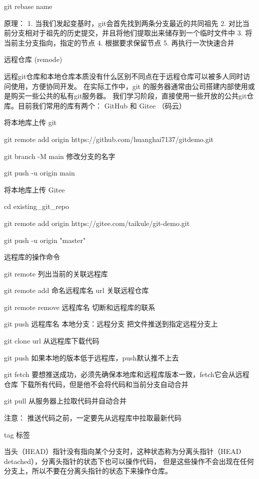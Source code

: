         git rebase name

        原理：
            1. 当我们发起变基时，git会首先找到两条分支最近的共同祖先
            2. 对比当前分支相对于祖先的历史提交，并且将他们提取出来储存到一个临时文件中
            3. 将当前主分支指向，指定的节点
            4. 根据要求保留节点
            5. 再执行一次快速合并

        远程仓库 (remode)

        远程git仓库和本地仓库本质没有什么区别不同点在于远程仓库可以被多人同时访问使用，方便协同开发。
        在实际工作中，git 的服务器通常由公司搭建内部使用或是购买一些公共的私有git服务器。
        我们学习阶段，直接使用一些开放的公共git仓库。目前我们常用的库有两个： GitHub 和 Gitee （码云）

        将本地库上传 git

        git remote add origin https://github.com/huanghai7137/gitdemo.git

        git branch -M main      修改分支的名字

        git push -u origin main

        将本地库上传 Gitee

        cd existing_git_repo

        git remote add origin https://gitee.com/taikule/git-demo.git
        
        git push -u origin "master"

        远程库的操作命令

        git remote      列出当前的关联远程库

        git remote add 命名远程库名 url   关联远程仓库

        git remote remove 远程库名      切断和远程库的联系

        git push 远程库名 本地分支：远程分支    把文件推送到指定远程分支上

        git clone url   从远程库下载代码

        git push    如果本地的版本低于远程库，push默认推不上去

        git fetch     要想推送成功，必须先确保本地库和远程库版本一致，fetch它会从远程仓库
                      下载所有代码，但是他不会将代码和当前分支自动合并

        git pull        从服务器上拉取代码并自动合并

        注意：  推送代码之前，一定要先从远程库中拉取最新代码

        tag  标签

        当头（HEAD）指针没有指向某个分支时，这种状态称为分离头指针（HEAD detached），分离头指针的状态下也可以操作代码，
        但是这些操作不会出现在任何分支上，所以不要在分离头指针的状态下来操作仓库。

